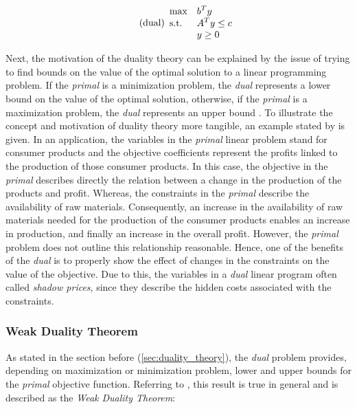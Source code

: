 \begin{equation}
    \tag{dual}
    \begin{array}{ll@{}ll}
        \text{max}  & \displaystyle b^{T}y &\\
        \text{s.t.}& \displaystyle A^{T}y \leq c &\\
                    &                        y \geq 0
    \end{array}
\end{equation}


Next, the motivation of the duality theory can be explained by the issue of trying to find 
bounds on the value of the optimal solution to a linear programming problem. 
If the \textit{primal} is a minimization problem, the \textit{dual} represents a lower bound
on the value of the optimal solution, otherwise, if the \textit{primal} is a maximization problem,
the \textit{dual} represents an upper bound .
To illustrate the concept and motivation of duality theory more tangible, an example stated by 
 is given. 
In an application, the variables in the \textit{primal} linear problem stand for consumer products and
the objective coefficients represent the profits linked to the production of those consumer products. 
In this case, the objective in the \textit{primal} describes directly the relation between a change
in the production of the products and profit. Whereas, the constraints in the \textit{primal} 
describe the availability of raw materials. Consequently, an increase in the availability of 
raw materials needed for the production of the consumer products enables an increase in production,
and finally an increase in the overall profit. 
However, the \textit{primal} problem does not outline this relationship reasonable. Hence, one of 
the benefits of the \textit{dual} is to properly show the effect of changes in the constraints on the
value of the objective. Due to this, the variables in a \textit{dual} linear program often called 
\textit{shadow prices}, since they describe the hidden costs associated with the constraints. 

\subsubsection{Weak Duality Theorem}
As stated in the section before (\ref{sec:duality_theory}), the \textit{dual} problem 
provides, depending on maximization or minimization problem, lower and upper bounds for 
the \textit{primal} objective function. Referring to ,
this result is true in general and is described as the \textit{Weak Duality Theorem}:

